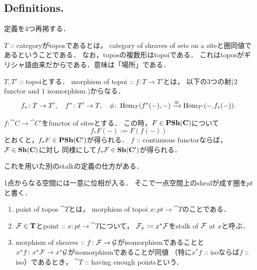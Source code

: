 \documentclass[a4paper, dvipdfmx]{jsarticle}
\begin{document}
\subsection{Definitions.}
    
定義を$4$つ再掲する．
\begin{Def}
    \begin{myenum}
    \item
    $T$ :: categoryがtoposであるとは，
    category of sheaves of sets on a siteと圏同値であるということである．
    なお，toposの複数形はtopoiである．
    これはtoposがギリシャ語由来だからである．意味は「場所」である．

    \item
    $T, T'$ :: topoiとする．
    morphism of topoi :: $f \colon T \to T'$とは，
    以下の$3$つの射($2$ functor and $1$ isomorphism.)からなる．
    \[
        f_* \colon T \to T', \quad f^* \colon T' \to T,
        \quad \phi \colon \operatorname{Hom}_{T}(f^*(-), -) \xrightarrow{\cong} \operatorname{Hom}_{T'}(-. f_*(-)).
    \]
    \end{myenum}
\end{Def}

\begin{Def}
    $f \colon \cat{C} \to \cat{C}'$をfunctor of sitesとする．
    この時，$F \in \mathbf{PSh}(\mathbf{C})$について
    \[ f_*F(-):=F(f(-)) \]
    とおくと，$f_* F \in \mathbf{PSh}(\mathbf{C}')$が得られる．
    $f$ :: continuous functorならば，
    $\mathcal{F} \in \mathbf{Sh}(\mathbf{C})$に対し
    同様にして$f_*\mathcal{F} \in \mathbf{Sh}(\mathbf{C}')$が得られる．
\end{Def}

これを用いた別のstalkの定義の仕方がある．
\begin{Def}
    1点からなる空間には一意に位相が入る．
    そこで一点空間上のsheafが成す圏を$pt$と書く．
    \begin{enumerate}[label=(\roman*)]
        \item
            point of topos $\cat{T}$とは，
            morphism of topoi $x \colon pt \to \cat{T}$のことである．
        \item
            $\mathcal{F} \in \mathbf{T}$とpoint :: $x \colon pt \to \cat{T}$について，
            $\mathcal{F}_x := x^*\mathcal{F}$をstalk of $\mathcal{F}$ at $x$と呼ぶ．
        \item
            morphism of sheaves :: $f \colon \mathcal{F} \to \mathcal{G}$がisomorphismであることと
            $x^* f \colon x^* \mathcal{F} \to x^* \mathcal{G}$がisomorphismであることが同値
            （特に$x^*f$ :: isoならば$f$ :: iso）であるとき，
            $\cat{T}$ :: having enough pointsという．
    \end{enumerate}
\end{Def}
\end{document}
